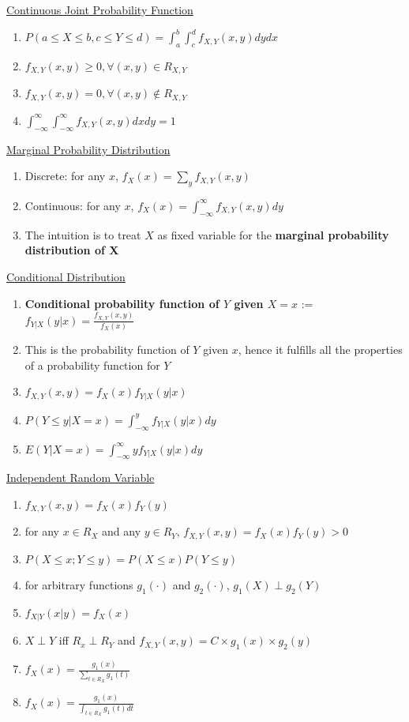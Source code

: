 \documentclass[a4paper,1pt,landscape]{article}
\begin{document}
\begin{multicols}{3}
\underline{Continuous Joint Probability Function}
\begin{enumerate}
    \item $P(a\leq X\leq b, c\leq Y \leq d) = \int_a^b \int_c^d f_{X,Y}(x,y)dydx$
    \item $f_{X,Y}(x,y) \geq 0, \forall (x,y) \in R_{X,Y}$
    \item $f_{X,Y}(x,y) = 0, \forall (x,y) \notin R_{X,Y}$
    \item $\int_{-\infty}^\infty \int_{-\infty}^\infty f_{X,Y}(x,y)dxdy=1$
\end{enumerate}

\underline{Marginal Probability Distribution}
\begin{enumerate}
    \item Discrete: for any $x$, $f_X(x) = \sum_y f_{X,Y}(x,y)$
    \item Continuous: for any $x$, $f_X(x) = \int_{-\infty}^\infty f_{X,Y}(x,y)dy$
    \item The intuition is to treat $X$ as fixed variable for the \textbf{marginal probability distribution of X}
\end{enumerate}

\underline{Conditional Distribution}
\begin{enumerate}
    \item \textbf{Conditional probability function of $Y$ given $X=x$} := $f_{Y|X}(y|x) = \frac{f_{X,Y}(x,y)}{f_X (x)}$
    \item This is the probability function of $Y$ given $x$, hence it fulfills all the properties of a probability function for $Y$
    \item $f_{X,Y}(x,y) = f_X (x)f_{Y|X}(y|x)$
    \item $P(Y \leq y|X=x) = \int_{-\infty}^y f_{Y|X}(y|x)dy$
    \item $E(Y|X=x) = \int_{-\infty}^\infty yf_{Y|X} (y|x) dy$
\end{enumerate}

\underline{Independent Random Variable}
\begin{enumerate}
    \item $f_{X,Y} (x, y) = f_X (x) f_Y (y)$
    \item for any $x \in R_X$ and any $y \in R_Y$, $f_{X,Y} (x, y) = f_X (x) f_Y (y) > 0$
    \item $P(X \leq x; Y \leq y) = P(X \leq x)P(Y\leq y)$
    \item for arbitrary functions $g_1(\cdot)$ and $g_2(\cdot)$, $g_1(X) \perp g_2(Y)$
    \item $f_{X|Y}(x|y) = f_X(x)$
    \item $X \perp Y$ iff $R_x \perp R_Y$ and $f_{X,Y}(x,y) = C \times g_1(x) \times g_2(y)$
    \item $f_X(x) = \frac{g_1(x)}{\sum_{t\in R_X} g_1(t)}$
    \item $f_X(x) = \frac{g_1(x)}{\int_{t\in R_X} g_1(t)dt}$
\end{enumerate}


\end{multicols}
\end{document}
